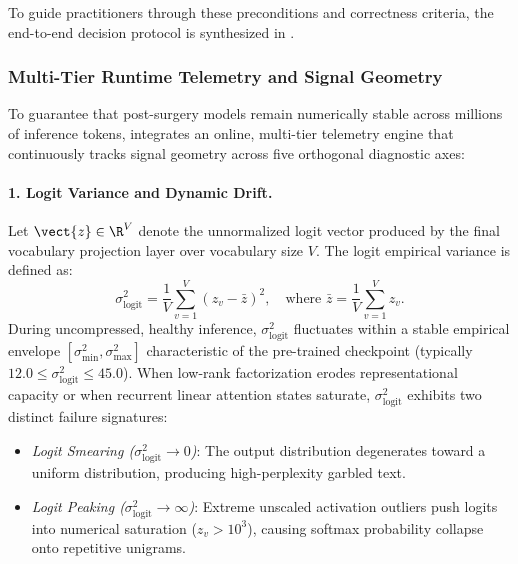 To guide practitioners through these preconditions and correctness criteria, the end-to-end decision protocol is synthesized in .

\subsubsection{Multi-Tier Runtime Telemetry and Signal Geometry}
\label{sec:runtime_telemetry}

To guarantee that post-surgery models remain numerically stable across millions of inference tokens, \neuralops{} integrates an online, multi-tier telemetry engine that continuously tracks signal geometry across five orthogonal diagnostic axes:

\paragraph{1. Logit Variance and Dynamic Drift.}
Let $\vect{z} \in \R^V$ denote the unnormalized logit vector produced by the final vocabulary projection layer over vocabulary size $V$. The logit empirical variance is defined as:
\begin{equation}
\sigma_{\text{logit}}^2 = \frac{1}{V} \sum_{v=1}^V \left(z_v - \bar{z}\right)^2, \quad \text{where } \bar{z} = \frac{1}{V}\sum_{v=1}^V z_v.
\end{equation}
During uncompressed, healthy inference, $\sigma_{\text{logit}}^2$ fluctuates within a stable empirical envelope $[\sigma_{\min}^2, \sigma_{\max}^2]$ characteristic of the pre-trained checkpoint (typically $12.0 \le \sigma_{\text{logit}}^2 \le 45.0$). When low-rank factorization erodes representational capacity or when recurrent linear attention states saturate, $\sigma_{\text{logit}}^2$ exhibits two distinct failure signatures:
\begin{itemize}
    \item \emph{Logit Smearing ($\sigma_{\text{logit}}^2 \to 0$)}: The output distribution degenerates toward a uniform distribution, producing high-perplexity garbled text.
    \item \emph{Logit Peaking ($\sigma_{\text{logit}}^2 \to \infty$)}: Extreme unscaled activation outliers push logits into numerical saturation ($z_v > 10^3$), causing softmax probability collapse onto repetitive unigrams.
\end{itemize}

